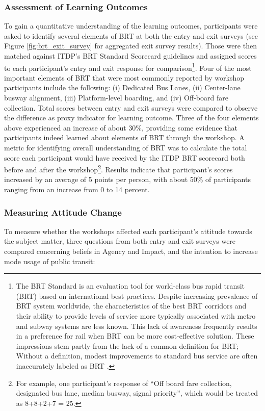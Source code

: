 {{        \subsubsection{Assessment of Learning Outcomes}
        {
            To gain a quantitative understanding of the learning outcomes, participants were asked to identify several elements of BRT at both the entry and exit surveys (see Figure \ref{fig:brt_exit_survey} for aggregated exit survey results). Those were then matched against ITDP's BRT Standard Scorecard guidelines \cite{TheScore30:online} and assigned scores to each participant's entry and exit response for comparison\footnote{The BRT Standard is an evaluation tool for world-class bus rapid transit (BRT) based on international best practices. Despite increasing prevalence of BRT system worldwide, the characteristics of the best BRT corridors and their ability to provide levels of service more typically associated with metro and subway systems are less known. This lack of awareness frequently results in a preference for rail when BRT can be more cost-effective solution. These impressions stem partly from the lack of a common definition for BRT; Without a definition, modest improvements to standard bus service are often inaccurately labeled as BRT \cite{TheScore30:online}.}. Four of the most important elements of BRT that were most commonly reported by workshop participants include the following: (i) Dedicated Bus Lanes, (ii) Center-lane busway alignment, (iii) Platform-level boarding, and (iv) Off-board fare collection.
            \newline
            Total scores between entry and exit surveys were compared to observe the difference as proxy indicator for learning outcome. Three of the four elements above experienced an increase of about 30\%, providing some evidence that participants indeed learned about elements of BRT through the workshop. A metric for identifying overall understanding of BRT was to calculate the total score each participant would have received by the ITDP BRT scorecard both before and after the workshop\footnote{For example, one participant's response of ``Off board fare collection, designated bus lane, median busway, signal priority'', which would be treated as 8+8+2+7 = 25.}. Results indicate that participant's scores increased by an average of 5 points per person, with about 50\% of participants ranging from an increase from 0 to 14 percent.
        }

        \subsubsection{Measuring Attitude Change}
        {
            To measure whether the workshops affected each participant's attitude towards the subject matter, three questions from both entry and exit surveys were compared concerning beliefs in Agency and Impact, and the intention to increase mode usage of public transit:

}}}
